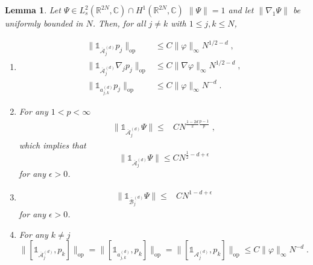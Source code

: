 \documentclass[11pt, english, american]{article}
\newtheorem{lemma}[theorem]{Lemma}
\renewcommand{\phi}{\varphi}
\begin{document}
\begin{lemma}
\label{propo}
Let $\Psi \in L^2_{s}(\mathbb{R}^{2N}, \mathbb{C}) \cap H^1(\mathbb{R}^{2N}, \mathbb{C})$ $\| \Psi\|=1$ and let $\| \nabla _1\Psi \|$ be uniformly bounded in $N$.
Then, for all $j\neq k$ with $1 \leq j,k \leq N$,
\begin{enumerate}
 \item
\begin{align*}
\|\mathds{1}_{\overline{\mathcal{A}}^{(d)}_{j}}p_j\|_{\text{op}}&\leq  C \| \phi\|_{\infty}N^{1/2-d}\;,
\\
\|\mathds{1}_{\overline{\mathcal{A}}^{(d)}_{j}} \nabla_j p_j\|_{\text{op}}&\leq  C\| \nabla\phi\|_{\infty} N^{1/2-d}\;,
\\
\|\mathds{1}_{a^{(d)}_{j,k}}p_j\|_{\text{op}}&\leq  C \|\phi\|_\infty N^{-d}
\;.
\end{align*}

\item
For any $1<p< \infty$
\begin{align*}\|\mathds{1}_{\overline{\mathcal{A}}^{(d)}_{j}}\Psi\|
\leq &
C
N^{\frac{1-2d}{2} \frac{p-1}{p}}
\;,
\end{align*}
which implies that
$$
\|\mathds{1}_{\overline{\mathcal{A}}^{(d)}_{j}}\Psi\| \leq
C
N^{\frac{1}{2}-d+ \epsilon}
$$
for any $\epsilon>0$.
\item
\begin{align*}
\|\mathds{1}_{\overline{\mathcal{B}}^{(d)}_{j}}\Psi\|\leq &
C
N^{1-d+ \epsilon} 
\end{align*}
for any $\epsilon>0$.
\item For any $k\neq j$
$$\|[\mathds{1}_{\overline{\mathcal{A}}^{(d)}_{j}},p_k]\|_{\text{op}}=\|[\mathds{1}_{a^{(d)}_{j,k}},p_k]\|_{\text{op}}=\|[\mathds{1}_{\mathcal{A}^{(d)}_{j}},p_k]\|_{\text{op}}\leq C \|\phi\|_\infty N^{-d}
\;.
$$

\end{enumerate}\end{lemma}
\end{document}
